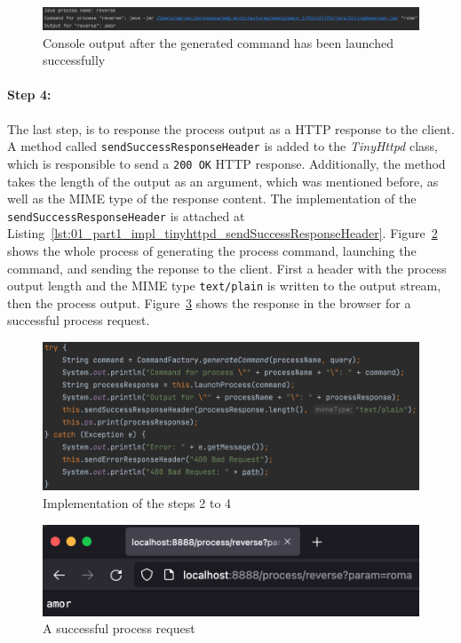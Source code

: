 \documentclass{article}
\def\Fig#1{Figure~\ref{#1}}
\def\Lst#1{Listing~\ref{#1}}
\begin{document}
\begin{figure}[h]
\centering
\includegraphics[scale=0.3]{images/implementationOutput}
\caption{Console output after the generated command has been launched successfully}
\label{fig:01_part1_impl_output}
\end{figure}


\paragraph{Step 4:}
The last step, is to response the process output as a HTTP response to the client.
A method called \texttt{sendSuccessResponseHeader} is added to the \textit{TinyHttpd} class, which is responsible to send a \texttt{200 OK} HTTP response. Additionally, the method takes the length of the output as an argument, which was mentioned before, as well as the MIME type of the response content. The implementation of the \texttt{sendSuccessResponseHeader} is attached at \Lst{lst:01_part1_impl_tinyhttpd_sendSuccessResponseHeader}.
\Fig{fig:01_part1_impl_all_steps} shows the whole process of generating the process command, launching the command, and sending the reponse to the client. First a header with the process output length and the MIME type \texttt{text/plain} is written to the output stream, then the process output. \Fig{fig:01_part1_impl_success} shows the response in the browser for a successful process request.

\begin{figure}[h]
\centering
\includegraphics[scale=0.45]{images/wholeProcess}
\caption{Implementation of the steps 2 to 4}
\label{fig:01_part1_impl_all_steps}
\end{figure}

\begin{figure}[h]
\centering
\includegraphics[scale=0.6]{images/part1Success}
\caption{A successful process request}
\label{fig:01_part1_impl_success}
\end{figure}
\end{document}
